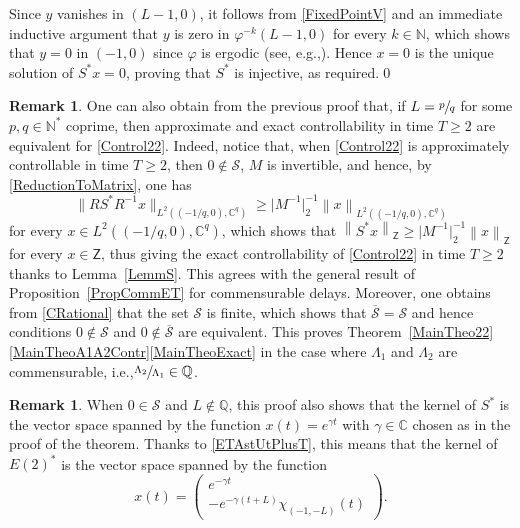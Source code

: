 \documentclass[10pt]{article}
\newcommand{\ie}{i.e.,\xspace}
\newcommand{\eg}{e.g.,\xspace}
\renewcommand{\eg}{e.g.,\xspace}
\theoremstyle{plain}
\theoremstyle{definition}
\newtheorem{remk}[theo]{Remark}
\newcommand{\norm}[1]{\left\lVert #1\right\lVert}
\newcommand{\nnorm}[1]{\lVert #1\lVert}
\newcommand{\nabs}[1]{\lvert #1 \rvert}
\numberwithin{equation}{section}\numberwithin{figure}{section}\emergencystretch=3em
\begin{document}
Since $y$ vanishes in $(L - 1, 0)$, it follows from \eqref{FixedPointV} and an immediate inductive argument that $y$ is zero in $\varphi^{-k}(L-1, 0)$ for every $k \in \mathbb N$, which shows that $y = 0$ in $(-1, 0)$ since $\varphi$ is ergodic (see, \eg \cite[Th.\,1.5]{Walters1982Introduction}). Hence $x = 0$ is the unique solution of $S^\ast x = 0$, proving that $S^\ast$ is injective, as required.\qed

\begin{remk}
\label{RemkControlDelayRational}
One can also obtain from the previous proof that, if $L = \sfrac{p}{q}$ for some $p, q \in \mathbb N^\ast$ coprime, then approximate and exact controllability in time $T \geq 2$ are equivalent for \eqref{Control22}. Indeed, notice that, when \eqref{Control22} is approximately controllable in time $T \geq 2$, then $0 \notin \mathcal S$, $M$ is invertible, and hence, by \eqref{ReductionToMatrix}, one has
\[
\nnorm{R S^\ast R^{-1} x}_{L^2\left(\left(-{1}/{q}, 0\right), \mathbb C^q\right)} \geq \nabs{M^{-1}}_{2}^{-1} \norm{x}_{L^2\left(\left(-{1}/{q}, 0\right), \mathbb C^q\right)}
\]
for every $x \in L^2\left(\left(-{1}/{q}, 0\right), \mathbb C^q\right)$,
which shows that $\norm{S^\ast x}_{\mathsf Z} \geq \nabs{M^{-1}}_{2}^{-1} \norm{x}_{\mathsf Z}$ for \hbox{every} $x \in \mathsf Z$, thus giving the exact controllability of \eqref{Control22} in time $T \geq 2$ thanks to Lemma~\ref{LemmS}. This agrees with the general result of Proposition~\ref{PropCommET} for commensurable delays. Moreover, one obtains from \eqref{CRational} that the set $\mathcal S$ is finite, which shows that $\overline{\mathcal S} = \mathcal S$ and hence conditions $0 \notin \mathcal S$ and $0 \notin \overline{\mathcal S}$ are equivalent. This proves Theorem~\ref{MainTheo22}\eqref{MainTheoA1A2Contr}\eqref{MainTheoExact} in the case where $\Lambda_1$ and $\Lambda_2$ are commensurable, \ie $\sfrac{\Lambda_2}{\Lambda_1} \in \mathbb Q$.
\end{remk}

\begin{remk}
When $0 \in \mathcal S$ and $L \notin \mathbb Q$, this proof also shows that the kernel of $S^\ast$ is the vector space spanned by the function $x(t) = e^{\gamma t}$ with $\gamma \in \mathbb C$ chosen as in the proof of the theorem. Thanks to \eqref{ETAstUtPlusT}, this means that the kernel of $E(2)^\ast$ is the vector space spanned by the function
\[
x(t) =
\begin{pmatrix}
e^{-\gamma t} \\
-e^{-\gamma(t + L)} \chi_{(-1, -L)}(t)
\end{pmatrix}.
\]
\end{remk}
\end{document}
